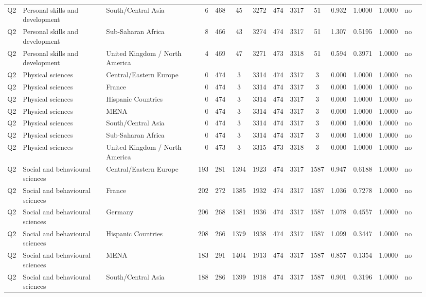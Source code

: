 \begin{longtable}{lllrcccccccccll}
Q2 & Personal skills and development & South/Central Asia & 6 & 468 & 45 & 3272 & 474 & 3317 & 51 & 0.932 & 1.0000 & 1.0000 & no \\
Q2 & Personal skills and development & Sub-Saharan Africa & 8 & 466 & 43 & 3274 & 474 & 3317 & 51 & 1.307 & 0.5195 & 1.0000 & no \\
Q2 & Personal skills and development & United Kingdom / North America & 4 & 469 & 47 & 3271 & 473 & 3318 & 51 & 0.594 & 0.3971 & 1.0000 & no \\
Q2 & Physical sciences & Central/Eastern Europe & 0 & 474 & 3 & 3314 & 474 & 3317 & 3 & 0.000 & 1.0000 & 1.0000 & no \\
Q2 & Physical sciences & France & 0 & 474 & 3 & 3314 & 474 & 3317 & 3 & 0.000 & 1.0000 & 1.0000 & no \\
Q2 & Physical sciences & Hispanic Countries & 0 & 474 & 3 & 3314 & 474 & 3317 & 3 & 0.000 & 1.0000 & 1.0000 & no \\
Q2 & Physical sciences & MENA & 0 & 474 & 3 & 3314 & 474 & 3317 & 3 & 0.000 & 1.0000 & 1.0000 & no \\
Q2 & Physical sciences & South/Central Asia & 0 & 474 & 3 & 3314 & 474 & 3317 & 3 & 0.000 & 1.0000 & 1.0000 & no \\
Q2 & Physical sciences & Sub-Saharan Africa & 0 & 474 & 3 & 3314 & 474 & 3317 & 3 & 0.000 & 1.0000 & 1.0000 & no \\
Q2 & Physical sciences & United Kingdom / North America & 0 & 473 & 3 & 3315 & 473 & 3318 & 3 & 0.000 & 1.0000 & 1.0000 & no \\
Q2 & Social and behavioural sciences & Central/Eastern Europe & 193 & 281 & 1394 & 1923 & 474 & 3317 & 1587 & 0.947 & 0.6188 & 1.0000 & no \\
Q2 & Social and behavioural sciences & France & 202 & 272 & 1385 & 1932 & 474 & 3317 & 1587 & 1.036 & 0.7278 & 1.0000 & no \\
Q2 & Social and behavioural sciences & Germany & 206 & 268 & 1381 & 1936 & 474 & 3317 & 1587 & 1.078 & 0.4557 & 1.0000 & no \\
Q2 & Social and behavioural sciences & Hispanic Countries & 208 & 266 & 1379 & 1938 & 474 & 3317 & 1587 & 1.099 & 0.3447 & 1.0000 & no \\
Q2 & Social and behavioural sciences & MENA & 183 & 291 & 1404 & 1913 & 474 & 3317 & 1587 & 0.857 & 0.1354 & 1.0000 & no \\
Q2 & Social and behavioural sciences & South/Central Asia & 188 & 286 & 1399 & 1918 & 474 & 3317 & 1587 & 0.901 & 0.3196 & 1.0000 & no \\

\end{longtable}
